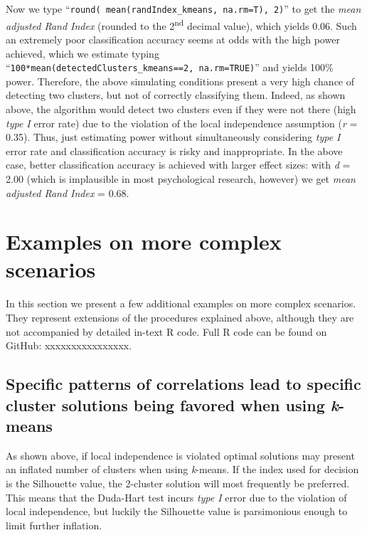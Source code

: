 \documentclass[
  man,floatsintext]{apa6}
\begin{document}
Now we type ``\texttt{round(\ mean(randIndex\_kmeans,\ na.rm=T),\ 2)}'' to get the \emph{mean adjusted Rand Index} (rounded to the 2\textsuperscript{nd} decimal value), which yields 0.06. Such an extremely poor classification accuracy seems at odds with the high power achieved, which we estimate typing ``\texttt{100*mean(detectedClusters\_kmeans==2,\ na.rm=TRUE)}'' and yields 100\% power. Therefore, the above simulating conditions present a very high chance of detecting two clusters, but not of correctly classifying them. Indeed, as shown above, the algorithm would detect two clusters even if they were not there (high \emph{type I} error rate) due to the violation of the local independence assumption (\emph{r} = 0.35). Thus, just estimating power without simultaneously considering \emph{type I} error rate and classification accuracy is risky and inappropriate. In the above case, better classification accuracy is achieved with larger effect sizes: with \emph{d} = 2.00 (which is implausible in most psychological research, however) we get \emph{mean adjusted Rand Index} = 0.68.

\hypertarget{examples-on-more-complex-scenarios}{%
\section{Examples on more complex scenarios}\label{examples-on-more-complex-scenarios}}

In this section we present a few additional examples on more complex scenarios. They represent extensions of the procedures explained above, although they are not accompanied by detailed in-text R code. Full R code can be found on GitHub: xxxxxxxxxxxxxxxx.

\hypertarget{specific-patterns-of-correlations-lead-to-specific-cluster-solutions-being-favored-when-using-k-means}{%
\subsection{\texorpdfstring{Specific patterns of correlations lead to specific cluster solutions being favored when using \emph{k}-means}{Specific patterns of correlations lead to specific cluster solutions being favored when using k-means}}\label{specific-patterns-of-correlations-lead-to-specific-cluster-solutions-being-favored-when-using-k-means}}

As shown above, if local independence is violated optimal solutions may present an inflated number of clusters when using \emph{k}-means. If the index used for decision is the Silhouette value, the 2-cluster solution will most frequently be preferred. This means that the Duda-Hart test incurs \emph{type I} error due to the violation of local independence, but luckily the Silhouette value is parsimonious enough to limit further inflation.
\end{document}
